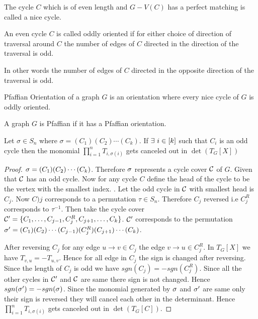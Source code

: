 \begin{definition}
	The cycle $C$ which is of even length and $G-V(C)$ has a perfect matching is called a nice cycle.
\end{definition}
\begin{definition}
	An even cycle $C$ is called oddly oriented if for  either choice of direction of traversal around $C$ the number of edges of $C$ directed in the direction of the traversal is odd.
	
	In other words the number of edges of $C$ directed in the opposite direction of the traversal is odd.
\end{definition}
\begin{definition}
	Pfaffian Orientation of a graph $G$ is an orientation where every nice cycle of $G$ is oddly oriented.
\end{definition}
\begin{definition}
	A graph $G$ is Pfaffian if it has a Pfaffian orientation.
\end{definition}
\begin{lemma}\label{lmoddcyclecancel}
	Let $\sigma\in S_n$ where $\sigma=(C_1)(C_2)\cdots (C_k)$. If $\exists\ i\in [k]$ such that $C_i$ is an odd cycle then the monomial $\prod\limits_{i=1}^n T_{i,\sigma(i)}$ gets canceled out in $\det(T_G[X])$
\end{lemma}
\begin{proof}
	$\sigma=(C_1)(C_2)\cdots (C_k)$. Therefore $\sigma$ represents a cycle cover $\mathcal{C}$ of $G$. Given that $\mathcal{C}$ has an odd cycle. Now for any cycle $C$ define the head of the cycle to be the vertex with the smallest index. . Let the odd cycle in $\mathcal{C}$ with smallest head is $C_j$. Now $C)j$ corresponds to a permutation $\tau\in S_n$. Therefore $C_j$ reversed i.e $C_j^R$ corresponds to $\tau^{-1}$. Then take the cycle cover $\mathcal{C}'=\{C_1,\dots,C_{j-1},C_j^R,C_{j+1},\dots,C_k\}$. $\mathcal{C}'$ corresponds to the permutation $\sigma'=(C_1)(C_2)\cdots(C_{j-1})(C_j^R)(C_{j+1})\cdots (C_k)$. 
	
	After reversing $C_{j}$ for any edge $u\to v\in C_j$ the edge $v\to u\in C_j^R$. In $T_G[X]$ we have $T_{v,u}=-T_{u,v}$. Hence for all edge in $C_j$ the sign is changed after reversing. Since the length of $C_j$ is odd we have $sgn(C_j)=-sgn(C_j^R)$. Since all the other cycles in $\mathcal{C}'$ and $\mathcal{C}$ are same there sign is not changed. Hence $sgn(\sigma')=-sgn(\sigma)$. Since the monomial generated by $\sigma$ and $\sigma'$ are same only their sign is reversed they will cancel each other in the determinant. Hence $\prod\limits_{i=1}^n T_{i,\sigma(i)}$ gets canceled out in $\det(T_G[C])$.	 
\end{proof}
